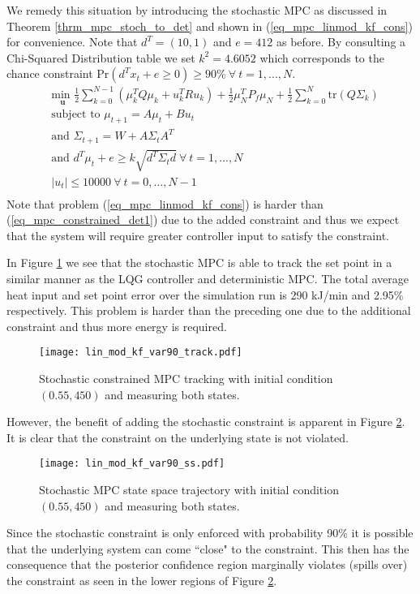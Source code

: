 We remedy this situation by introducing the stochastic MPC as discussed in Theorem \ref{thrm_mpc_stoch_to_det} and shown in (\ref{eq_mpc_linmod_kf_cons}) for convenience. Note that $d^T = (10, 1)$ and $e=412$ as before. By consulting a Chi-Squared Distribution table we set $k^2 = 4.6052$ which corresponds to the chance constraint $\text{Pr}(d^Tx_t + e \geq 0) \geq 90\% ~\forall ~t=1,...,N$.
\begin{equation}
\begin{aligned}
&\underset{\mathbf{u}}{\text{min }} \frac{1}{2}\sum_{k=0}^{N-1} \left( \mu_k^TQ\mu_k + u_k^TRu_k \right) + \frac{1}{2}\mu_N^TP_f\mu_N + \frac{1}{2}\sum_{k=0}^N \text{tr}(Q\Sigma_k) \\
& \text{subject to } \mu_{t+1}=A\mu_t + Bu_t \\
& \text{and } \Sigma_{t+1} = W+A\Sigma_t A^T \\
& \text{and } d^T\mu_t + e \geq k\sqrt{d^T \Sigma_t d} ~\forall ~t=1,...,N\\
&  |u_t| \leq 10000 ~\forall ~t=0,...,N-1\\
\end{aligned}
\label{eq_mpc_linmod_kf_cons}
\end{equation}
Note that problem (\ref{eq_mpc_linmod_kf_cons}) is harder than (\ref{eq_mpc_constrained_det1}) due to the added constraint and thus we expect that the system will require greater controller input to satisfy the constraint. 

In Figure \ref{fig_lin_mod_kf_var90_track} we see that the stochastic MPC is able to track the set point in a similar manner as the LQG controller and deterministic MPC. The total average heat input and set point error over the simulation run is 290 kJ/min and 2.95\% respectively. This problem is harder than the preceding one due to the additional constraint and thus more energy is required. 
\begin{figure}[H] 
\centering
\texttt{[image: lin\_mod\_kf\_var90\_track.pdf]}
\caption{Stochastic constrained MPC tracking with initial condition $(0.55, 450)$ and measuring both states.}
\label{fig_lin_mod_kf_var90_track}
\end{figure}
However, the benefit of adding the stochastic constraint is apparent in Figure \ref{fig_lin_mod_kf_var90_ss}. It is clear that the constraint on the underlying state is not violated.
\begin{figure}[H] 
\centering
\texttt{[image: lin\_mod\_kf\_var90\_ss.pdf]}
\caption{Stochastic MPC state space trajectory with initial condition $(0.55, 450)$ and measuring both states.}
\label{fig_lin_mod_kf_var90_ss}
\end{figure}
Since the stochastic constraint is only enforced with probability 90\% it is possible that the underlying system can come ``close" to the constraint. This then has the consequence that the posterior confidence region marginally violates (spills over) the constraint as seen in the lower regions of Figure \ref{fig_lin_mod_kf_var90_ss}.

